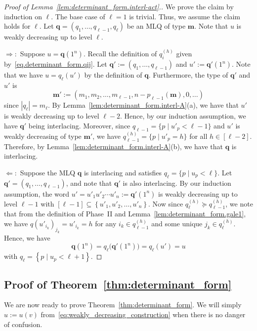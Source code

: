 \documentclass[reqno]{amsart}
\newcommand{\0}{\phantom{c}}
\newcommand{\mm}{\mathbf{m}}
\newcommand{\qq}{\mathbf{q}}
\newcommand{\set}[1]{\left\{ #1 \right\}}
\newcommand{\abs}[1]{\left| #1 \right|}
\newcommand{\tup}[1]{\left( #1 \right)}
\newcommand{\ive}[1]{\left[ #1 \right]}
\theoremstyle{plain}
\theoremstyle{definition}
\numberwithin{equation}{section}
\begin{document}
\begin{proof}[Proof of Lemma~\ref{lem:determinant_form.interl-act}.]
We prove the claim by induction on $\ell$.
The base case of $\ell = 1$ is trivial.
Thus, we assume the claim holds for $\ell$.
Let $\qq = \tup{q_1, \dotsc, q_{\ell-1}, q_{\ell}}$ be an MLQ of type $\mm$.
Note that $u$ is weakly decreasing up to level $\ell$.

$\Longrightarrow:$
Suppose $u = \qq(1^n)$.
Recall the definition of $q_i^{(h)}$ given by~\eqref{eq.determinant_form.qij}.
Let $\qq' := \tup{q_1, \dotsc, q_{\ell-1}}$ and $u' := \qq'(1^n)$.
Note that we have $u = q_{\ell}(u')$ by the definition of $\qq$.
Furthermore, the type of $\qq'$ and $u'$ is
\[
\mm' := (m_1, m_2, \dotsc, m_{\ell-1}, n - p_{\ell-1}(\mm), 0, \ldots)
\]
since $\abs{q_{\ell}} = m_{\ell}$.
By Lemma~\ref{lem:determinant_form.interl-A}(a), we have that $u'$ is weakly decreasing up to level $\ell-2$.
Hence, by our induction assumption, we have $\qq'$ being interlacing.
Moreover, since $q_{\ell-1} = \{p \mid u'_p < \ell-1\}$ and $u'$ is weakly decreasing of type $\mm'$, we have $q_{\ell-1}^{(h)} = \{p \mid u'_p = h\}$ for all $h \in \ive{\ell-2}$.
Therefore, by Lemma~\ref{lem:determinant_form.interl-A}(b), we have that $\qq$ is interlacing.

$\Longleftarrow:$
Suppose the MLQ $\qq$ is interlacing and satisfies $q_{\ell} = \{ p \mid u_p < \ell \}$.
Let $\qq' = \tup{q_1, \dotsc, q_{\ell-1}}$, and note that $\qq'$ is also interlacing.
By our induction assumption, the word $u' = u'_1 u'_2 \dotsm u'_n  := \qq'(1^n)$ is weakly decreasing up to level $\ell - 1$ with $\ive{\ell-1} \subseteq \set{u'_1, u'_2, \dotsc, u'_n}$.
Now since $q_{\ell}^{(h)} \succeq q_{\ell-1}^{(h)}$, we note that from the definition of Phase~II and Lemma~\ref{lem:determinant_form.gale1}, we have $q(u'_{i_k})_{j_k} = u'_{i_k} = h$ for any $i_k \in q_{\ell-1}^{(h)}$ and some unique $j_k \in q_{\ell}^{(h)}$.
Hence, we have
\[
\qq(1^n) = q_{\ell}\bigl( \qq'(1^n) \bigr) = q_{\ell}(u') = u
\]
with $q_{\ell} = \set{p \mid u_p < \ell+1}$.
\end{proof}


\subsection{Proof of Theorem~\ref{thm:determinant_form}}

We are now ready to prove Theorem~\ref{thm:determinant_form}.
We will simply $u := u(v)$ from~\eqref{eq:weakly_decreasing_construction} when there is no danger of confusion.
\end{document}
